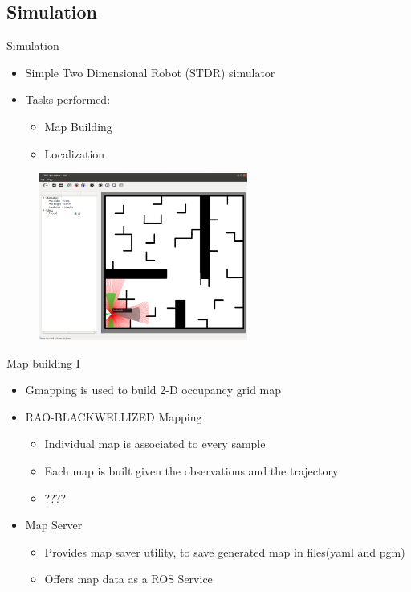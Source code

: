 
\subsection{Simulation}

\begin{frame}{Simulation}
    \begin{itemize}
        \item Simple Two Dimensional Robot (STDR) simulator	
        \item Tasks  performed:
        \begin{itemize}
            \item Map Building
            \item Localization
        \end{itemize}
    \end{itemize}
    
    \centering
    \includegraphics[width=90mm,height=55mm]{gfx/stdr_simulator}
    
\end{frame}
\begin{frame}{Map building I}
    \begin{itemize}
        \item Gmapping is used to build 2-D occupancy grid map 
        \item RAO-BLACKWELLIZED Mapping 
        \begin{itemize}
            \item Individual map is associated to every sample
            \item Each map is built given the observations and the
trajectory
            \item ????

        \end{itemize}
        \item Map Server
        \begin{itemize}
            \item Provides map saver utility, to save generated map in files(yaml and pgm)
            \item Offers map data as a ROS Service
        \end{itemize}
        
    \end{itemize}
\end{frame}
